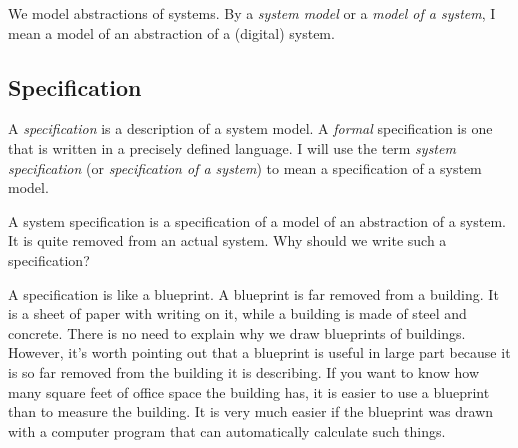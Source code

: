 \documentclass[fleqn,leqno]{article}
\begin{document}
We model abstractions of systems.  By a \emph{system model} or a
\emph{model of a system}, I mean a model of an abstraction of a
(digital) system.



%
\vspace{-\baselineskip}
\subsection{Specification}    
A \emph{specification} 
is a description of a system model.  A
\emph{formal} specification is one that is written in a precisely
defined language.  I will use the term \emph{system specification} (or
\emph{specification of a system}) to mean a specification of a system
model.  

A system specification is a specification of a model of an abstraction
of a system.  It is quite removed from an actual system.  Why should
we write such a specification?

A specification is like a 
blueprint.  A blueprint is far removed from a building.  It is a sheet
of paper with writing on it, while a building is made of steel and
concrete.  There is no need to explain why we draw blueprints of
buildings.  However, it's worth pointing out that a blueprint is
useful in large part because it is so far removed from the building it
is describing.  If you want to know how many square feet of office
space the building has, it is easier to use a blueprint than to
measure the building.  It is very much easier if the blueprint was
drawn with a computer program that can automatically calculate such
things.
\end{document}
